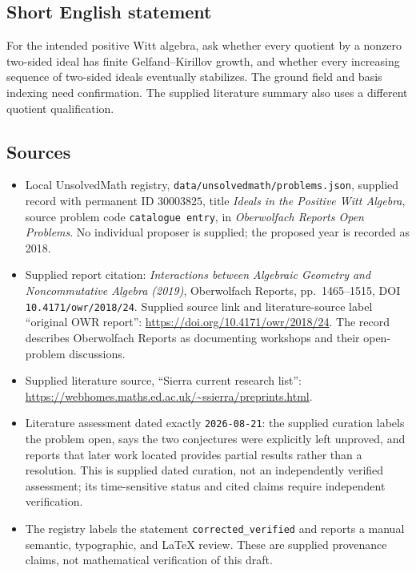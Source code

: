 \documentclass[11pt]{article}
\begin{document}
\subsection{Short English statement}
For the intended positive Witt algebra, ask whether every quotient by a nonzero two-sided ideal has finite Gelfand--Kirillov growth, and whether every increasing sequence of two-sided ideals eventually stabilizes. The ground field and basis indexing need confirmation. The supplied literature summary also uses a different quotient qualification.
\subsection{Sources}
\begin{itemize}
\item Local UnsolvedMath registry, \texttt{data/unsolvedmath/problems.json}, supplied record with permanent ID \(30003825\), title \emph{Ideals in the Positive Witt Algebra}, source problem code \texttt{catalogue entry}, in \emph{Oberwolfach Reports Open Problems}. No individual proposer is supplied; the proposed year is recorded as 2018.
\item Supplied report citation: \emph{Interactions between Algebraic Geometry and Noncommutative Algebra (2019)}, Oberwolfach Reports, pp.\ 1465--1515, DOI \texttt{10.4171/owr/2018/24}. Supplied source link and literature-source label ``original OWR report'': \url{https://doi.org/10.4171/owr/2018/24}. The record describes Oberwolfach Reports as documenting workshops and their open-problem discussions.
\item Supplied literature source, ``Sierra current research list'': \url{https://webhomes.maths.ed.ac.uk/~ssierra/preprints.html}.
\item Literature assessment dated exactly \texttt{2026-08-21}: the supplied curation labels the problem open, says the two conjectures were explicitly left unproved, and reports that later work located provides partial results rather than a resolution. This is supplied dated curation, not an independently verified assessment; its time-sensitive status and cited claims require independent verification.
\item The registry labels the statement \texttt{corrected\_verified} and reports a manual semantic, typographic, and LaTeX review. These are supplied provenance claims, not mathematical verification of this draft.
\end{itemize}
\end{document}
